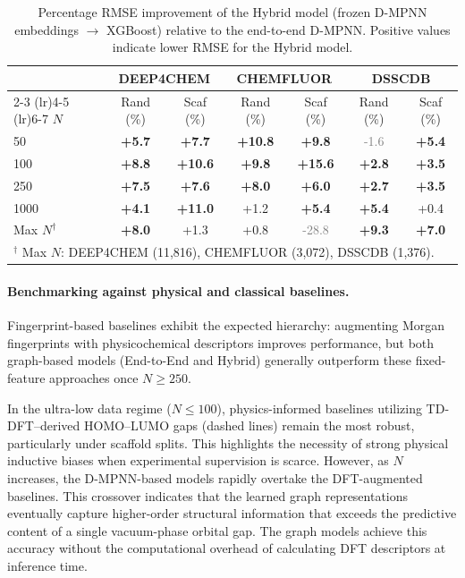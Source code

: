 \begin{table}[h]
\centering
\caption{Percentage RMSE improvement of the Hybrid model (frozen D-MPNN embeddings $\rightarrow$ XGBoost) relative to the end-to-end D-MPNN. Positive values indicate lower RMSE for the Hybrid model.}
\label{tab:hybrid_pct_improvement}
\begin{tabular}{lcccccc}
\toprule
 & \multicolumn{2}{c}{\textbf{DEEP4CHEM}} & \multicolumn{2}{c}{\textbf{CHEMFLUOR}} & \multicolumn{2}{c}{\textbf{DSSCDB}} \\
\cmidrule(lr){2-3} \cmidrule(lr){4-5} \cmidrule(lr){6-7}
$N$ 
& Rand (\%) & Scaf (\%) 
& Rand (\%) & Scaf (\%) 
& Rand (\%) & Scaf (\%) \\
\midrule
50   & \textbf{+5.7} & \textbf{+7.7} & \textbf{+10.8} & \textbf{+9.8}  & \textcolor{gray}{-1.6} & \textbf{+5.4} \\
100  & \textbf{+8.8} & \textbf{+10.6}& \textbf{+9.8}  & \textbf{+15.6} & \textbf{+2.8} & \textbf{+3.5} \\
250  & \textbf{+7.5} & \textbf{+7.6} & \textbf{+8.0}  & \textbf{+6.0}  & \textbf{+2.7} & \textbf{+3.5} \\
1000 & \textbf{+4.1} & \textbf{+11.0}& +1.2           & \textbf{+5.4}  & \textbf{+5.4} & +0.4 \\
Max $N^{\dagger}$ 
     & \textbf{+8.0} & +1.3           & +0.8           & \textcolor{gray}{-28.8} & \textbf{+9.3} & \textbf{+7.0} \\
\bottomrule
\multicolumn{7}{l}{\footnotesize $^\dagger$ Max $N$: DEEP4CHEM (11,816), CHEMFLUOR (3,072), DSSCDB (1,376).}
\end{tabular}
\end{table}

\paragraph{Benchmarking against physical and classical baselines.}
Fingerprint-based baselines exhibit the expected hierarchy: augmenting Morgan fingerprints with physicochemical descriptors improves performance, but both graph-based models (End-to-End and Hybrid) generally outperform these fixed-feature approaches once $N \geq 250$.

In the ultra-low data regime ($N \leq 100$), physics-informed baselines utilizing TD-DFT--derived HOMO--LUMO gaps (dashed lines) remain the most robust, particularly under scaffold splits. This highlights the necessity of strong physical inductive biases when experimental supervision is scarce. However, as $N$ increases, the D-MPNN-based models rapidly overtake the DFT-augmented baselines. This crossover indicates that the learned graph representations eventually capture higher-order structural information that exceeds the predictive content of a single vacuum-phase orbital gap. The graph models achieve this accuracy without the computational overhead of calculating DFT descriptors at inference time.

